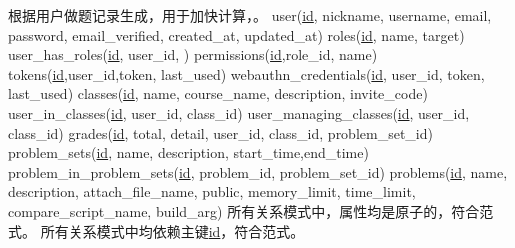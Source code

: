 \markdownRendererUlItem 根据用户做题记录生成，用于加快计算，。\markdownRendererUlItemEnd 
\markdownRendererUlEndTight \markdownRendererInterblockSeparator
{}\markdownRendererInterblockSeparator
{}\markdownRendererInterblockSeparator
{}\markdownRendererInterblockSeparator
{}\markdownRendererInterblockSeparator
{}\markdownRendererUlBeginTight
\markdownRendererUlItem user(\underline{id}, nickname, username, email, password, email\_verified, created\_at, updated\_at)\markdownRendererUlItemEnd 
\markdownRendererUlItem roles(\underline{id}, name, target)\markdownRendererUlItemEnd 
\markdownRendererUlItem user\_has\_roles(\underline{id}, user\_id, )\markdownRendererUlItemEnd 
\markdownRendererUlItem permissions(\underline{id},role\_id, name)\markdownRendererUlItemEnd 
\markdownRendererUlItem tokens(\underline{id},user\_id,token, last\_used)\markdownRendererUlItemEnd 
\markdownRendererUlItem webauthn\_credentials(\underline{id}, user\_id, token, last\_used)\markdownRendererUlItemEnd 
\markdownRendererUlItem classes(\underline{id}, name, course\_name, description, invite\_code)\markdownRendererUlItemEnd 
\markdownRendererUlItem user\_in\_classes(\underline{id}, user\_id, class\_id)\markdownRendererUlItemEnd 
\markdownRendererUlItem user\_managing\_classes(\underline{id}, user\_id, class\_id)\markdownRendererUlItemEnd 
\markdownRendererUlItem grades(\underline{id}, total, detail, user\_id, class\_id, problem\_set\_id)\markdownRendererUlItemEnd 
\markdownRendererUlItem problem\_sets(\underline{id}, name, description, start\_time,end\_time)\markdownRendererUlItemEnd 
\markdownRendererUlItem problem\_in\_problem\_sets(\underline{id}, problem\_id, problem\_set\_id)\markdownRendererUlItemEnd 
\markdownRendererUlItem problems(\underline{id}, name, description, attach\_file\_name, public, memory\_limit, time\_limit, compare\_script\_name, build\_arg)\markdownRendererUlItemEnd 
\markdownRendererUlEndTight \markdownRendererInterblockSeparator
{}\markdownRendererInterblockSeparator
{}\markdownRendererInterblockSeparator
{}所有关系模式中，属性均是原子的，符合范式。\markdownRendererInterblockSeparator
{}\markdownRendererInterblockSeparator
{}所有关系模式中均依赖主键\underline{id}，符合范式。\markdownRendererInterblockSeparator
